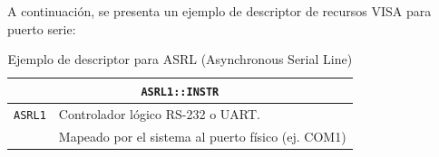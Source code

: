 A continuación, se presenta un ejemplo de descriptor de recursos VISA para puerto serie:

\vspace{3\baselineskip}
\begin{table}[H]
    \centering
    \caption{Ejemplo de descriptor para ASRL (Asynchronous Serial Line)}
    \begin{tabular}{@{}ll@{}}
        \toprule
        \multicolumn{2}{c}{\textbf{\texttt{ASRL1::INSTR}}} \\ \midrule
        \texttt{ASRL1} & Controlador lógico RS-232 o UART.                  \\
                       & Mapeado por el sistema al puerto físico (ej. COM1) \\ \bottomrule
    \end{tabular}
    \label{tab:descriptor_asrl}
\end{table}
\vspace{3\baselineskip}